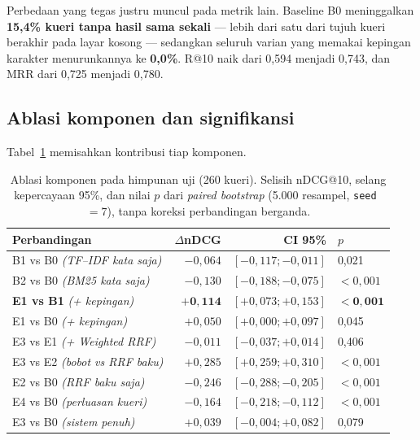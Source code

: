 \documentclass[journal,twoside,web]{ieeecolor}
\begin{document}
Perbedaan yang tegas justru muncul pada metrik lain. Baseline B0 meninggalkan
\textbf{15,4\% kueri tanpa hasil sama sekali} --- lebih dari satu dari tujuh
kueri berakhir pada layar kosong --- sedangkan seluruh varian yang memakai
kepingan karakter menurunkannya ke \textbf{0,0\%}. R@10 naik dari 0,594 menjadi
0,743, dan MRR dari 0,725 menjadi 0,780.

\subsection{Ablasi komponen dan signifikansi}

Tabel~\ref{tab:ablasi} memisahkan kontribusi tiap komponen.

\begin{table}[!t]
\caption{Ablasi komponen pada himpunan uji (260 kueri). Selisih nDCG@10, selang
kepercayaan 95\%, dan nilai $p$ dari \emph{paired bootstrap} (5.000 resampel,
\texttt{seed}~$=7$), tanpa koreksi perbandingan berganda.}
\label{tab:ablasi}
\centering
\footnotesize
\begin{tabular}{@{}lrrl@{}}
\toprule
\textbf{Perbandingan} & \textbf{$\Delta$nDCG} & \textbf{CI 95\%} & \textbf{$p$} \\
\midrule
B1 vs B0 \emph{(TF--IDF kata saja)}     & $-0{,}064$ & $[-0{,}117; -0{,}011]$ & 0,021 \\
B2 vs B0 \emph{(BM25 kata saja)}        & $-0{,}130$ & $[-0{,}188; -0{,}075]$ & $<0{,}001$ \\
\textbf{E1 vs B1} \emph{(+ kepingan)}   & $\mathbf{+0{,}114}$ & $[+0{,}073; +0{,}153]$ & $\mathbf{<0{,}001}$ \\
E1 vs B0 \emph{(+ kepingan)}            & $+0{,}050$ & $[+0{,}000; +0{,}097]$ & 0,045 \\
E3 vs E1 \emph{(+ Weighted RRF)}        & $-0{,}011$ & $[-0{,}037; +0{,}014]$ & 0,406 \\
E3 vs E2 \emph{(bobot vs RRF baku)}     & $+0{,}285$ & $[+0{,}259; +0{,}310]$ & $<0{,}001$ \\
E2 vs B0 \emph{(RRF baku saja)}         & $-0{,}246$ & $[-0{,}288; -0{,}205]$ & $<0{,}001$ \\
E4 vs B0 \emph{(perluasan kueri)}       & $-0{,}164$ & $[-0{,}218; -0{,}112]$ & $<0{,}001$ \\
E3 vs B0 \emph{(sistem penuh)}          & $+0{,}039$ & $[-0{,}004; +0{,}082]$ & 0,079 \\
\bottomrule
\end{tabular}
\end{table}
\end{document}
